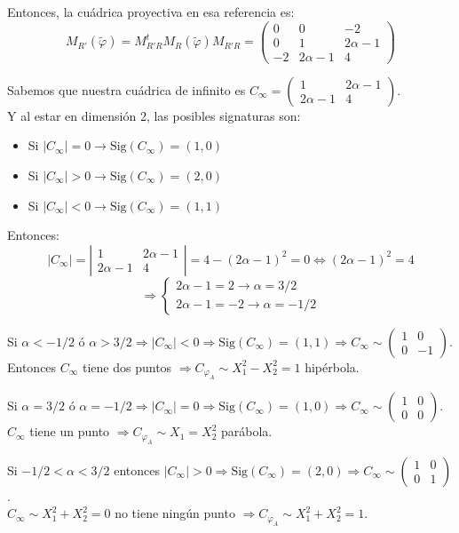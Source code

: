 {Entonces, la cuádrica proyectiva en esa referencia es:
\[
M_{R'}(\tilde{\varphi}) = M_{R'R}^t M_R(\tilde{\varphi}) M_{R'R} = 
\begin{pmatrix} 
0 & 0 & -2 \\ 
0 & 1 & 2\alpha - 1 \\ 
-2 & 2\alpha - 1 & 4 
\end{pmatrix}
\]

Sabemos que nuestra cuádrica de infinito es $C_\infty = \begin{pmatrix} 1 & 2\alpha-1 \\ 2\alpha-1 & 4 \end{pmatrix}$.\\
Y al estar en dimensión 2, las posibles signaturas son:
\begin{itemize}
    \item Si $|C_\infty| = 0 \to \text{Sig}(C_\infty) = (1,0)$
    \item Si $|C_\infty| > 0 \to \text{Sig}(C_\infty) = (2,0)$
    \item Si $|C_\infty| < 0 \to \text{Sig}(C_\infty) = (1,1)$
\end{itemize}

Entonces:
\[
|C_\infty| = 
\left| \begin{matrix} 
1 & 2\alpha-1 \\ 
2\alpha-1 & 4 
\end{matrix} \right| 
= 4 - (2\alpha-1)^2 = 0 \iff (2\alpha-1)^2 = 4
\]
\[
\Rightarrow 
\begin{cases} 
2\alpha-1 = 2 \to \alpha = 3/2 \\ 
2\alpha-1 = -2 \to \alpha = -1/2 
\end{cases}
\]

Si $\alpha < -1/2$ ó $\alpha > 3/2 \Rightarrow |C_\infty| < 0 \Rightarrow \text{Sig}(C_\infty) = (1,1) \Rightarrow C_\infty \sim \begin{pmatrix} 1 & 0 \\ 0 & -1 \end{pmatrix}$.\\
Entonces $C_\infty$ tiene dos puntos $\Rightarrow C_{\varphi_A} \sim X_1^2 - X_2^2 = 1$ hipérbola.

Si $\alpha = 3/2$ ó $\alpha = -1/2 \Rightarrow |C_\infty| = 0 \Rightarrow \text{Sig}(C_\infty) = (1,0) \Rightarrow C_\infty \sim \begin{pmatrix} 1 & 0 \\ 0 & 0 \end{pmatrix}$.\\
$C_\infty$ tiene un punto $\Rightarrow C_{\varphi_A} \sim X_1 = X_2^2$ parábola.

Si $-1/2 < \alpha < 3/2$ entonces $|C_\infty| > 0 \Rightarrow \text{Sig}(C_\infty) = (2,0) \Rightarrow C_\infty \sim \begin{pmatrix} 1 & 0 \\ 0 & 1 \end{pmatrix}$.\\
$C_\infty \sim X_1^2 + X_2^2 = 0$ no tiene ningún punto $\Rightarrow C_{\varphi_A} \sim X_1^2 + X_2^2 = 1$.}

